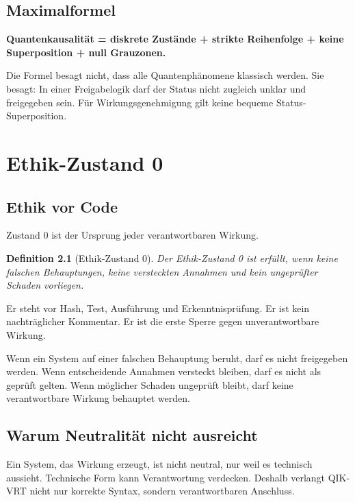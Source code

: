 \documentclass[11pt,a4paper,oneside]{book}
\newtheorem{definition}{Definition}[chapter]
\begin{document}
\section{Maximalformel}

\begin{merkbox}
\centering
\textbf{Quantenkausalität = diskrete Zustände + strikte Reihenfolge + keine Superposition + null Grauzonen.}
\end{merkbox}

Die Formel besagt nicht, dass alle Quantenphänomene klassisch werden. Sie besagt: In einer Freigabelogik darf der Status nicht zugleich unklar und freigegeben sein. Für Wirkungsgenehmigung gilt keine bequeme Status-Superposition.

\chapter{Ethik-Zustand 0}

\section{Ethik vor Code}

Zustand 0 ist der Ursprung jeder verantwortbaren Wirkung.

\begin{definition}[Ethik-Zustand 0]
Der Ethik-Zustand 0 ist erfüllt, wenn keine falschen Behauptungen, keine versteckten Annahmen und kein ungeprüfter Schaden vorliegen.
\end{definition}

Er steht vor Hash, Test, Ausführung und Erkenntnisprüfung. Er ist kein nachträglicher Kommentar. Er ist die erste Sperre gegen unverantwortbare Wirkung.

Wenn ein System auf einer falschen Behauptung beruht, darf es nicht freigegeben werden. Wenn entscheidende Annahmen versteckt bleiben, darf es nicht als geprüft gelten. Wenn möglicher Schaden ungeprüft bleibt, darf keine verantwortbare Wirkung behauptet werden.

\section{Warum Neutralität nicht ausreicht}

Ein System, das Wirkung erzeugt, ist nicht neutral, nur weil es technisch aussieht. Technische Form kann Verantwortung verdecken. Deshalb verlangt QIK-VRT nicht nur korrekte Syntax, sondern verantwortbaren Anschluss.
\end{document}
